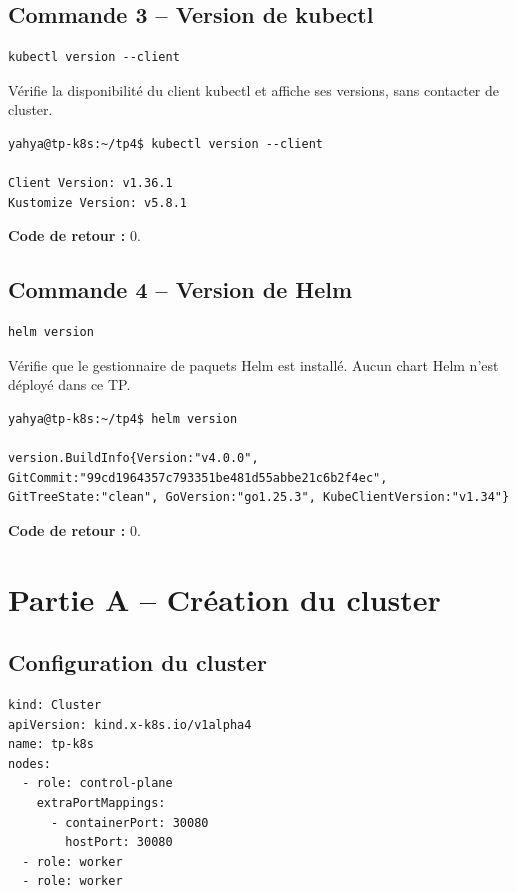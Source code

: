 \documentclass[11pt,a4paper]{article}
\begin{document}
\subsection{Commande 3 -- Version de kubectl}
\begin{lstlisting}
kubectl version --client
\end{lstlisting}
Vérifie la disponibilité du client kubectl et affiche ses versions, sans contacter de cluster.
\begin{tcolorbox}[terminal,title={Ubuntu / WSL2 -- Commande 3 -- rendu reconstitué}]
\begin{Verbatim}[fontsize=\scriptsize,breaklines=true,breakanywhere=true,breaksymbolleft={},breaksymbolright={}]
yahya@tp-k8s:~/tp4$ kubectl version --client

Client Version: v1.36.1
Kustomize Version: v5.8.1
\end{Verbatim}
\end{tcolorbox}
\textbf{Code de retour :} 0.

\subsection{Commande 4 -- Version de Helm}
\begin{lstlisting}
helm version
\end{lstlisting}
Vérifie que le gestionnaire de paquets Helm est installé. Aucun chart Helm n’est déployé dans ce TP.
\begin{tcolorbox}[terminal,title={Ubuntu / WSL2 -- Commande 4 -- rendu reconstitué}]
\begin{Verbatim}[fontsize=\scriptsize,breaklines=true,breakanywhere=true,breaksymbolleft={},breaksymbolright={}]
yahya@tp-k8s:~/tp4$ helm version

version.BuildInfo{Version:"v4.0.0", GitCommit:"99cd1964357c793351be481d55abbe21c6b2f4ec", GitTreeState:"clean", GoVersion:"go1.25.3", KubeClientVersion:"v1.34"}
\end{Verbatim}
\end{tcolorbox}
\textbf{Code de retour :} 0.

\clearpage
\section{Partie A -- Création du cluster}
\subsection{Configuration du cluster}
\begin{lstlisting}
kind: Cluster
apiVersion: kind.x-k8s.io/v1alpha4
name: tp-k8s
nodes:
  - role: control-plane
    extraPortMappings:
      - containerPort: 30080
        hostPort: 30080
  - role: worker
  - role: worker
\end{lstlisting}
\end{document}
